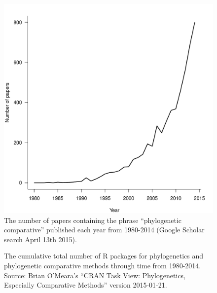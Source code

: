 \documentclass[a4paper,12pt]{article}
\begin{document}
  \begin{figure}[!htbp]
    \centering
      \includegraphics[width=12cm]{Figures/PCMCitations.pdf}
      \caption{The number of papers containing the phrase ``phylogenetic comparative'' published each year from 1980-2014 (Google Scholar search April 13th 2015).}
      \label{PCMCitations}
  \end{figure}

\newpage
  \begin{figure}[!htbp]
    \centering
      \caption{The cumulative total number of R packages for phylogenetics and phylogenetic comparative methods through time from 1980-2014. Source: Brian O'Meara's ``CRAN Task View: Phylogenetics, Especially Comparative Methods'' version 2015-01-21.}
      \label{PCMRpackages}
  \end{figure}
\end{document}
